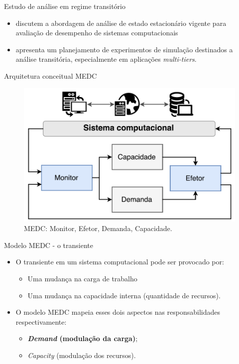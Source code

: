 \begin{frame}{Estudo de análise em regime transitório}
	\begin{itemize}
		\item \cite{Lourenco2015} discutem a abordagem de análise de estado estacionário vigente para avaliação de desempenho de sistemas computacionais
		
		\item apresenta um planejamento de experimentos de simulação destinados a análise transitória, especialmente em aplicações \textit{multi-tiers}.
	\end{itemize}
\end{frame}

\begin{frame}{Arquitetura conceitual MEDC}
	\begin{figure}
		\centering
		\includegraphics[scale=.4]{images/medc.png}
		\caption{MEDC: Monitor, Efetor, Demanda, Capacidade. \cite{Lourenco2015}}
		\label{fig:medc1}
	\end{figure}
\end{frame}

\begin{frame}{Modelo MEDC - o transiente}
	\begin{itemize}
		\item O transiente em um sistema computacional pode ser provocado por:
		\begin{itemize}
			\item Uma mudança na carga de trabalho 
			\item Uma mudança na capacidade interna (quantidade de recursos).
		\end{itemize}  
		\item O modelo MEDC mapeia esses dois aspectos nas responsabilidades respectivamente:
		\begin{itemize}
			\item \textbf{\textit{Demand} (modulação da carga)};
			\item \textit{Capacity} (modulação dos recursos).
		\end{itemize}
	\end{itemize}
\end{frame}



